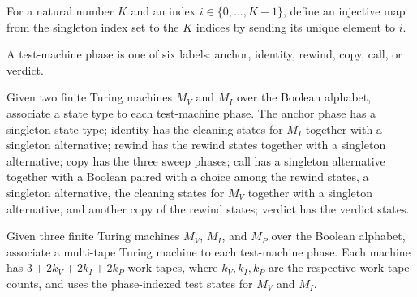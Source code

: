 \begin{definition}
\label{Complexity.b2b_singleEmb}
\leanok
For a natural number $K$ and an index $i\in\{0,\ldots,K-1\}$, define an injective map
from the singleton index set to the $K$ indices by sending its unique element to $i$.
\end{definition}

\begin{definition}
\label{Complexity.B2bTestPhase}
\leanok
A test-machine phase is one of six labels: anchor, identity, rewind, copy, call, or
verdict.
\end{definition}

\begin{definition}
\label{Complexity.b2b_testState}
\leanok
{}
Given two finite Turing machines $M_V$ and $M_I$ over the Boolean alphabet, associate a
state type to each test-machine phase. The anchor phase has a singleton state type;
identity has the cleaning states for $M_I$ together with a singleton alternative; rewind
has the rewind states together with a singleton alternative; copy has the three sweep
phases; call has a singleton alternative together with a Boolean paired with a choice
among the rewind states, a singleton alternative, the cleaning states for $M_V$ together
with a singleton alternative, and another copy of the rewind states; verdict has the
verdict states.
\end{definition}

\begin{definition}
\label{Complexity.b2b_testPhases}
\leanok
{}
Given three finite Turing machines $M_V$, $M_I$, and $M_P$ over the Boolean alphabet,
associate a multi-tape Turing machine to each test-machine phase. Each machine has
$3+2k_V+2k_I+2k_P$ work tapes, where $k_V,k_I,k_P$ are the respective work-tape counts,
and uses the phase-indexed test states for $M_V$ and $M_I$.
\end{definition}

